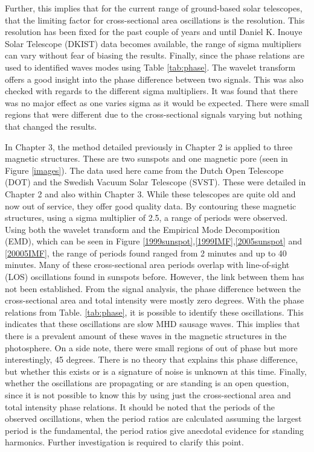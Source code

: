     Further, this implies that for the current range of ground-based solar telescopes, that the limiting factor for cross-sectional area oscillations is the resolution.
    This resolution has been fixed for the past couple of years and until Daniel K. Inouye Solar Telescope (DKIST) data becomes available, the range of sigma multipliers can vary without fear of biasing the results. 
    Finally, since the phase relations are used to identified waves modes using Table \ref{tab:phase}.
    The wavelet transform offers a good insight into the phase difference between two signals.
    This was also checked with regards to the different sigma multipliers.
    It was found that there was no major effect as one varies sigma as it would be expected.
    There were small regions that were different due to the cross-sectional signals varying but nothing that changed the results.
    
    In Chapter 3, the method detailed previously in Chapter 2 is applied to three magnetic structures.
    These are two sunspots and one magnetic pore (seen in Figure \ref{images}).
    The data used here came from the Dutch Open Telescope (DOT) and the Swedish Vacuum Solar Telescope (SVST). 
    These were detailed in Chapter 2 and also within Chapter 3.
    While these telescopes are quite old and now out of service, they offer good quality data.
    By contouring these magnetic structures, using a sigma multiplier of 2.5, a range of periods were observed.   
    Using both the wavelet transform and the Empirical Mode Decomposition (EMD), which can be seen in Figure \ref{1999sunspot},\ref{1999IMF},\ref{2005sunspot} and \ref{20005IMF}, the range of periods found ranged from 2 minutes and up to 40 minutes. 
    Many of these cross-sectional area periods overlap with line-of-sight (LOS) oscillations found in sunspots before.
    However, the link between them has not been established.
    From the signal analysis, the phase difference between the cross-sectional area and total intensity were mostly zero degrees.
    With the phase relations from Table. \ref{tab:phase}, it is possible to identify these oscillations.
    This indicates that these oscillations are slow MHD sausage waves.
    This implies that there is a prevalent amount of these waves in the magnetic structures in the photosphere.
    On a side note, there were small regions of out of phase but more interestingly, 45 degrees.
    There is no theory that explains this phase difference, but whether this exists or is a signature of noise is unknown at this time.
    Finally, whether the oscillations are propagating or are standing is an open question, since it is not possible to know this by using just the cross-sectional area and total intensity phase relations.    
    It should be noted that the periods of the observed oscillations, when the period ratios are calculated assuming the largest period is the fundamental, the period ratios give anecdotal evidence for standing harmonics.
    Further investigation is required to clarify this point.
    
